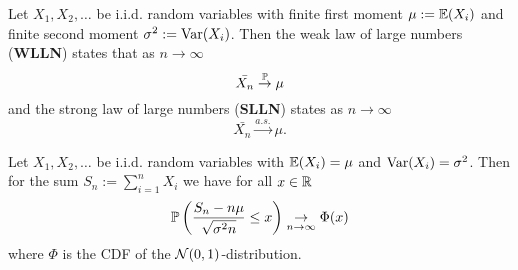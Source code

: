 \pagebreak
\begin{theorem*}
  Let \(X_1, X_2, \ldots\) be i.i.d. random variables with finite first moment \(\mu := \E(X_i)\) and finite second moment \(\sigma^2 := \Var(X_i)\). Then the weak law of large numbers (\textbf{WLLN}) states that as \(n \to \infty\)
  \[\bar{X_n} \stackrel{\P}{\to} \mu\]
  and the strong law of large numbers (\textbf{SLLN}) states as \(n \to \infty\)
  \[\bar{X_n} \stackrel{a.s.}{\to} \mu.\]
\end{theorem*}

\begin{theorem*}
  Let \(X_1, X_2, \ldots\) be i.i.d. random variables with \(\E(X_i) = \mu\) and \(\Var(X_i) = \sigma^2\). Then for the sum \(S_n := \sum_{i=1}^n X_i\) we have for all \(x \in \R\)
  \[\P\left(\frac{S_n - n \mu}{\sqrt{\sigma^2n}} \leq x\right) \underset{n \to \infty}{\to} \Phi(x)\]
  where \(\Phi\) is the CDF of the \(\Normal(0, 1)\)-distribution.
\end{theorem*}
